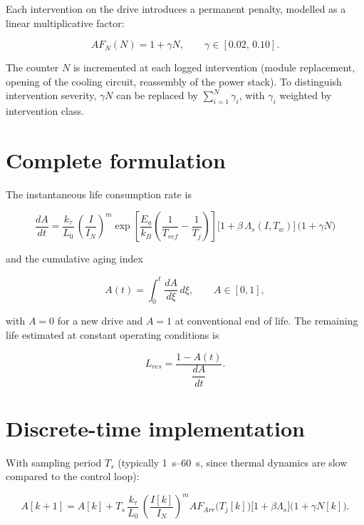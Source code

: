 \documentclass[11pt,a4paper]{article}
\begin{document}
Each intervention on the drive introduces a permanent penalty, modelled as a
linear multiplicative factor:

\begin{equation}
  AF_N(N) = 1 + \gamma N ,
  \qquad \gamma \in [0.02,\,0.10].
  \label{eq:interventi}
\end{equation}

The counter $N$ is incremented at each logged intervention (module replacement,
opening of the cooling circuit, reassembly of the power stack). To distinguish
intervention severity, $\gamma N$ can be replaced by $\sum_{i=1}^{N}\gamma_i$,
with $\gamma_i$ weighted by intervention class.

\section{Complete formulation}

The instantaneous life consumption rate is

\begin{equation}
  \boxed{\;
  \frac{dA}{dt} =
  \frac{k_\tau}{L_0}\,
  \left(\frac{I}{I_N}\right)^{m}
  \exp\!\left[\frac{E_a}{k_B}\!\left(\frac{1}{T_{ref}}-\frac{1}{T_j}\right)\right]
  \bigl[1+\beta\,\Lambda_s(I,T_w)\bigr]\,
  \bigl(1+\gamma N\bigr)\;}
  \label{eq:master}
\end{equation}

and the cumulative aging index

\begin{equation}
  A(t) = \int_{0}^{t} \frac{dA}{d\xi}\,d\xi ,
  \qquad
  A \in [0,1],
\end{equation}

with $A = 0$ for a new drive and $A = 1$ at conventional end of life. The
remaining life estimated at constant operating conditions is

\begin{equation}
  L_{res} = \frac{1 - A(t)}{\dfrac{dA}{dt}} .
\end{equation}

\section{Discrete-time implementation}

With sampling period $T_s$ (typically \SIrange{1}{60}{\second}, since thermal
dynamics are slow compared to the control loop):

\begin{equation}
  A[k+1] = A[k] + T_s\,
  \frac{k_\tau}{L_0}\,
  \left(\frac{I[k]}{I_N}\right)^{m} AF_{Arr}\bigl(T_j[k]\bigr)
  \bigl[1+\beta\Lambda_s\bigr]\bigl(1+\gamma N[k]\bigr).
\end{equation}
\end{document}
